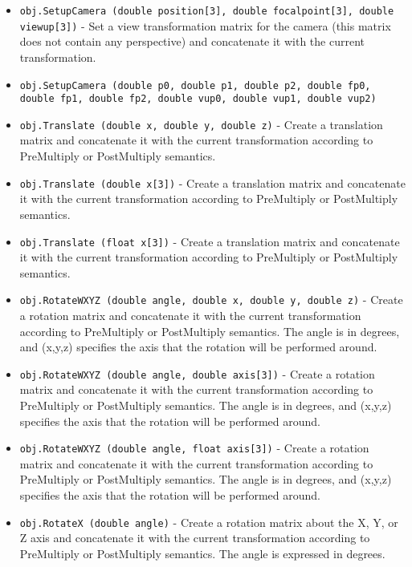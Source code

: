 \begin{itemize}
\item  \verb|obj.SetupCamera (double position[3], double focalpoint[3], double viewup[3])| -  Set a view transformation matrix for the camera (this matrix does
 not contain any perspective) and concatenate it with the current
 transformation.

\item  \verb|obj.SetupCamera (double p0, double p1, double p2, double fp0, double fp1, double fp2, double vup0, double vup1, double vup2)|

\item  \verb|obj.Translate (double x, double y, double z)| -  Create a translation matrix and concatenate it with the current
 transformation according to PreMultiply or PostMultiply semantics.

\item  \verb|obj.Translate (double x[3])| -  Create a translation matrix and concatenate it with the current
 transformation according to PreMultiply or PostMultiply semantics.

\item  \verb|obj.Translate (float x[3])| -  Create a translation matrix and concatenate it with the current
 transformation according to PreMultiply or PostMultiply semantics.

\item  \verb|obj.RotateWXYZ (double angle, double x, double y, double z)| -  Create a rotation matrix and concatenate it with the current
 transformation according to PreMultiply or PostMultiply semantics.
 The angle is in degrees, and (x,y,z) specifies the axis that the
 rotation will be performed around. 

\item  \verb|obj.RotateWXYZ (double angle, double axis[3])| -  Create a rotation matrix and concatenate it with the current
 transformation according to PreMultiply or PostMultiply semantics.
 The angle is in degrees, and (x,y,z) specifies the axis that the
 rotation will be performed around. 

\item  \verb|obj.RotateWXYZ (double angle, float axis[3])| -  Create a rotation matrix and concatenate it with the current
 transformation according to PreMultiply or PostMultiply semantics.
 The angle is in degrees, and (x,y,z) specifies the axis that the
 rotation will be performed around. 

\item  \verb|obj.RotateX (double angle)| -  Create a rotation matrix about the X, Y, or Z axis and concatenate
 it with the current transformation according to PreMultiply or
 PostMultiply semantics.  The angle is expressed in degrees.


\end{itemize}
